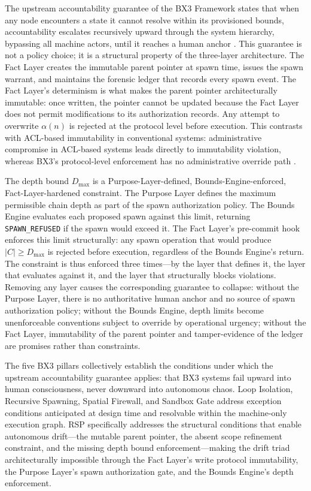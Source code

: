 The upstream accountability guarantee of the BX3 Framework states that when any node encounters a state it cannot resolve within its provisioned bounds, accountability escalates recursively upward through the system hierarchy, bypassing all machine actors, until it reaches a human anchor \cite{bx3-framework,bx3framework2026}. This guarantee is not a policy choice; it is a structural property of the three-layer architecture. The Fact Layer creates the immutable parent pointer at spawn time, issues the spawn warrant, and maintains the forensic ledger that records every spawn event. The Fact Layer's determinism is what makes the parent pointer architecturally immutable: once written, the pointer cannot be updated because the Fact Layer does not permit modifications to its authorization records. Any attempt to overwrite $\alpha(n)$ is rejected at the protocol level before execution. This contrasts with ACL-based immutability in conventional systems: administrative compromise in ACL-based systems leads directly to immutability violation, whereas BX3's protocol-level enforcement has no administrative override path \cite{bx3-framework,bansal2019}.

The depth bound $D_{\max}$ is a Purpose-Layer-defined, Bounds-Engine-enforced, Fact-Layer-hardened constraint. The Purpose Layer defines the maximum permissible chain depth as part of the spawn authorization policy. The Bounds Engine evaluates each proposed spawn against this limit, returning \texttt{SPAWN\_REFUSED} if the spawn would exceed it. The Fact Layer's pre-commit hook enforces this limit structurally: any spawn operation that would produce $|C| \geq D_{\max}$ is rejected before execution, regardless of the Bounds Engine's return. The constraint is thus enforced three times---by the layer that defines it, the layer that evaluates against it, and the layer that structurally blocks violations. Removing any layer causes the corresponding guarantee to collapse: without the Purpose Layer, there is no authoritative human anchor and no source of spawn authorization policy; without the Bounds Engine, depth limits become unenforceable conventions subject to override by operational urgency; without the Fact Layer, immutability of the parent pointer and tamper-evidence of the ledger are promises rather than constraints.

The five BX3 pillars collectively establish the conditions under which the upstream accountability guarantee applies: that BX3 systems fail upward into human consciousness, never downward into autonomous chaos. Loop Isolation, Recursive Spawning, Spatial Firewall, and Sandbox Gate address exception conditions anticipated at design time and resolvable within the machine-only execution graph. RSP specifically addresses the structural conditions that enable autonomous drift---the mutable parent pointer, the absent scope refinement constraint, and the missing depth bound enforcement---making the drift triad architecturally impossible through the Fact Layer's write protocol immutability, the Purpose Layer's spawn authorization gate, and the Bounds Engine's depth enforcement.


